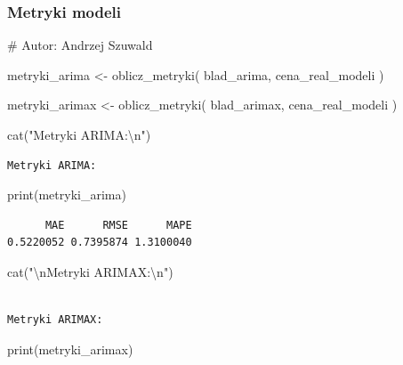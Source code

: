 \documentclass[
  polish,
  letterpaper,
  DIV=11,
  numbers=noendperiod]{scrartcl}
\newenvironment{Shaded}{\begin{snugshade}}{\end{snugshade}}
\newcommand{\CommentTok}[1]{\textcolor[rgb]{0.37,0.37,0.37}{#1}}
\newcommand{\FunctionTok}[1]{\textcolor[rgb]{0.28,0.35,0.67}{#1}}
\newcommand{\NormalTok}[1]{\textcolor[rgb]{0.00,0.23,0.31}{#1}}
\newcommand{\OtherTok}[1]{\textcolor[rgb]{0.00,0.23,0.31}{#1}}
\newcommand{\SpecialCharTok}[1]{\textcolor[rgb]{0.37,0.37,0.37}{#1}}
\newcommand{\StringTok}[1]{\textcolor[rgb]{0.13,0.47,0.30}{#1}}
\begin{document}
\subsubsection{Metryki modeli}\label{metryki-modeli}

\begin{Shaded}
\begin{Highlighting}[]
\CommentTok{\# Autor: Andrzej Szuwald}

\NormalTok{metryki\_arima }\OtherTok{\textless{}{-}} \FunctionTok{oblicz\_metryki}\NormalTok{(}
\NormalTok{  blad\_arima,}
\NormalTok{  cena\_real\_modeli}
\NormalTok{)}

\NormalTok{metryki\_arimax }\OtherTok{\textless{}{-}} \FunctionTok{oblicz\_metryki}\NormalTok{(}
\NormalTok{  blad\_arimax,}
\NormalTok{  cena\_real\_modeli}
\NormalTok{)}

\FunctionTok{cat}\NormalTok{(}\StringTok{"Metryki ARIMA:}\SpecialCharTok{\textbackslash{}n}\StringTok{"}\NormalTok{)}
\end{Highlighting}
\end{Shaded}

\begin{verbatim}
Metryki ARIMA:
\end{verbatim}

\begin{Shaded}
\begin{Highlighting}[]
\FunctionTok{print}\NormalTok{(metryki\_arima)}
\end{Highlighting}
\end{Shaded}

\begin{verbatim}
      MAE      RMSE      MAPE 
0.5220052 0.7395874 1.3100040 
\end{verbatim}

\begin{Shaded}
\begin{Highlighting}[]
\FunctionTok{cat}\NormalTok{(}\StringTok{"}\SpecialCharTok{\textbackslash{}n}\StringTok{Metryki ARIMAX:}\SpecialCharTok{\textbackslash{}n}\StringTok{"}\NormalTok{)}
\end{Highlighting}
\end{Shaded}

\begin{verbatim}

Metryki ARIMAX:
\end{verbatim}

\begin{Shaded}
\begin{Highlighting}[]
\FunctionTok{print}\NormalTok{(metryki\_arimax)}
\end{Highlighting}
\end{Shaded}
\end{document}
